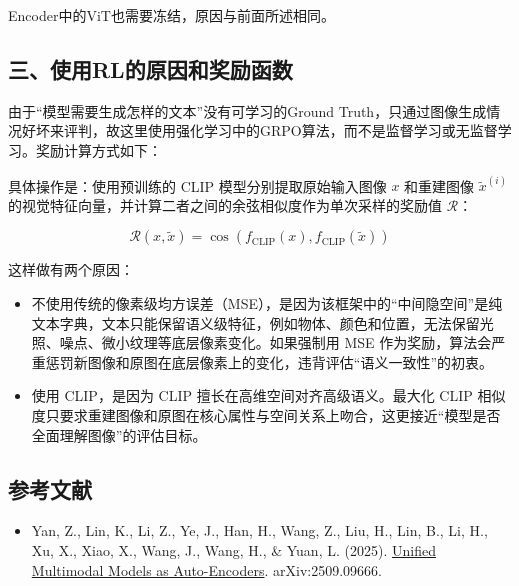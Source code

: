Encoder中的ViT也需要冻结，原因与前面所述相同。

\hypertarget{ux4e09ux4f7fux7528rlux7684ux539fux56e0ux548cux5956ux52b1ux51fdux6570}{%
\subsection{三、使用RL的原因和奖励函数}\label{ux4e09ux4f7fux7528rlux7684ux539fux56e0ux548cux5956ux52b1ux51fdux6570}}

由于``模型需要生成怎样的文本''没有可学习的Ground Truth，只通过图像生成情况好坏来评判，故这里使用强化学习中的GRPO算法，而不是监督学习或无监督学习。奖励计算方式如下：

具体操作是：使用预训练的 CLIP 模型分别提取原始输入图像 \(x\) 和重建图像 \(\tilde{x}^{(i)}\) 的视觉特征向量，并计算二者之间的余弦相似度作为单次采样的奖励值 \(\mathcal{R}\)：

\[
\mathcal{R}(x, \tilde{x}) = \cos\left(f_{\mathrm{CLIP}}(x), f_{\mathrm{CLIP}}(\tilde{x})\right)
\]

这样做有两个原因：

\begin{itemize}
\tightlist
\item
  不使用传统的像素级均方误差（MSE），是因为该框架中的``中间隐空间''是纯文本字典，文本只能保留语义级特征，例如物体、颜色和位置，无法保留光照、噪点、微小纹理等底层像素变化。如果强制用 MSE 作为奖励，算法会严重惩罚新图像和原图在底层像素上的变化，违背评估``语义一致性''的初衷。
\item
  使用 CLIP，是因为 CLIP 擅长在高维空间对齐高级语义。最大化 CLIP 相似度只要求重建图像和原图在核心属性与空间关系上吻合，这更接近``模型是否全面理解图像''的评估目标。
\end{itemize}

\hypertarget{ux53c2ux8003ux6587ux732e-200}{%
\subsection{参考文献}\label{ux53c2ux8003ux6587ux732e-200}}

\begin{itemize}
\tightlist
\item
  Yan, Z., Lin, K., Li, Z., Ye, J., Han, H., Wang, Z., Liu, H., Lin, B., Li, H., Xu, X., Xiao, X., Wang, J., Wang, H., \& Yuan, L. (2025). \href{https://arxiv.org/abs/2509.09666}{Unified Multimodal Models as Auto-Encoders}. arXiv:2509.09666.
\end{itemize}

\clearpage

